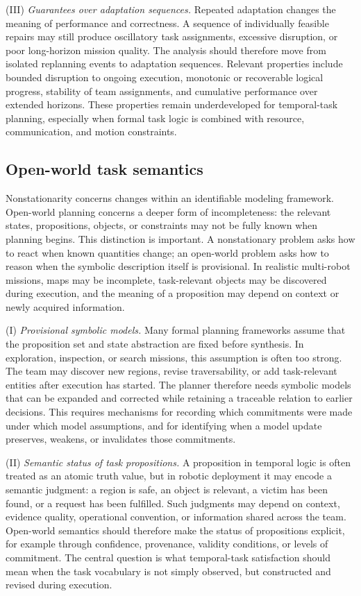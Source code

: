 (III) \emph{Guarantees over adaptation sequences.}
Repeated adaptation changes the meaning of performance and correctness. A
sequence of individually feasible repairs may still produce oscillatory task
assignments, excessive disruption, or poor long-horizon mission quality. The
analysis should therefore move from isolated replanning events to adaptation
sequences. Relevant properties include bounded disruption to ongoing
execution, monotonic or recoverable logical progress, stability of team
assignments, and cumulative performance over extended horizons. These
properties remain underdeveloped for temporal-task planning, especially when
formal task logic is combined with resource, communication, and motion
constraints.

\subsection{Open-world task semantics}
\label{sec:ch07_open_world}

Nonstationarity concerns changes within an identifiable modeling framework.
Open-world planning concerns a deeper form of incompleteness: the relevant
states, propositions, objects, or constraints may not be fully known when
planning begins. This distinction is important. A nonstationary problem asks
how to react when known quantities change; an open-world problem asks how to
reason when the symbolic description itself is provisional. In realistic
multi-robot missions, maps may be incomplete, task-relevant objects may be
discovered during execution, and the meaning of a proposition may depend on
context or newly acquired information.

(I) \emph{Provisional symbolic models.}
Many formal planning frameworks assume that the proposition set and state
abstraction are fixed before synthesis. In exploration, inspection, or search
missions, this assumption is often too strong. The team may discover new
regions, revise traversability, or add task-relevant entities after execution
has started. The planner therefore needs symbolic models that can be expanded
and corrected while retaining a traceable relation to earlier decisions. This
requires mechanisms for recording which commitments were made under which
model assumptions, and for identifying when a model update preserves,
weakens, or invalidates those commitments.

(II) \emph{Semantic status of task propositions.}
A proposition in temporal logic is often treated as an atomic truth value, but
in robotic deployment it may encode a semantic judgment: a region is safe, an
object is relevant, a victim has been found, or a request has been fulfilled.
Such judgments may depend on context, evidence quality, operational
convention, or information shared across the team. Open-world semantics should
therefore make the status of propositions explicit, for example through
confidence, provenance, validity conditions, or levels of commitment. The
central question is what temporal-task satisfaction should mean when the task
vocabulary is not simply observed, but constructed and revised during
execution.

